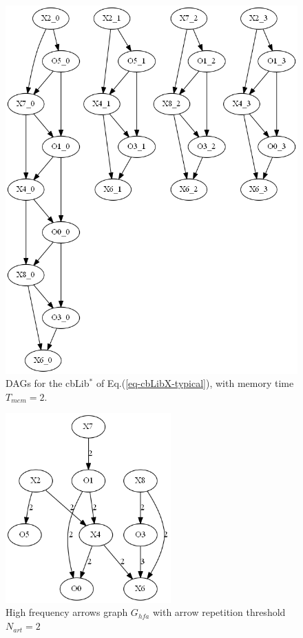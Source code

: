 \documentclass[12pt]{article}
\begin{document}
\begin{figure}[h!]
\centering
\includegraphics[width=5in]
{dags_cbLibX.png}
\caption{DAGs for the cbLib$^*$ 
of Eq.(\ref{eq-cbLibX-typical}),
with memory time $T_{mem}=2$. }
\label{fig-dags-cbLibX}
\end{figure}

\begin{figure}[h!]
\centering
\includegraphics[width=2.5in]
{G_hfa.png}
\caption{High frequency arrows graph 
$G_{hfa}$ with 
arrow repetition threshold $N_{art}=2$}
\label{fig-G-hfa}
\end{figure}
\end{document}

